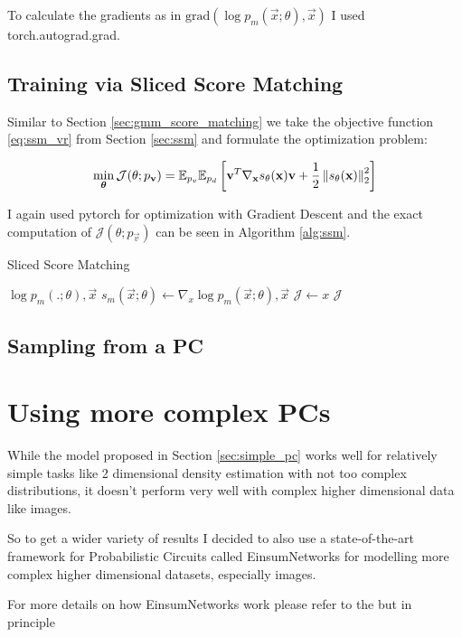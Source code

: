 To calculate the gradients as in $\text{grad}(\log p_m(\vec x;\theta), \vec x)$ I used torch.autograd.grad. 


\subsection{Training via Sliced Score Matching}
\label{sec:gmm_ssm}

Similar to Section \ref{sec:gmm_score_matching} we take the objective function \ref{eq:ssm_vr} from Section \ref{sec:ssm} and formulate
the optimization problem:

\begin{equation}
    \min_{\substack{\boldsymbol \theta}}  \mathcal{J}(\theta; p_{\textbf{v}}) = \mathbb{E}_{p_v} \mathbb{E}_{p_d} \left[ \textbf{v}^T \nabla_{\textbf{x}} s_\theta(\textbf{x}) \textbf{v} + \frac{1}{2} \left\lVert s_\theta(\textbf{x}) \right\rVert^2_2 \right]
    \label{eq:ssm_optimization_problem}
\end{equation}

I again used pytorch for optimization with Gradient Descent and the exact computation of $\mathcal{J}(\theta; p_\vec{v})$ can be seen 
in Algorithm \ref{alg:ssm}.

\begin{algorithm}
    \caption{Sliced Score Matching}
    \label{alg:ssm}
    \begin{algorithmic}[1]  
        \Require $\log p_m(.;\theta), \vec x$
        \State $s_m(\vec x; \theta) \gets \nabla_x \log p_m(\vec x;\theta), \vec x$
        \State $\mathcal{J} \gets x$
        \State \Return $\mathcal{J}$
    \end{algorithmic}
\end{algorithm}

\subsection{Sampling from a PC}
\label{sec:gmm_sampling}

\section{Using more complex PCs}

While the model proposed in Section \ref{sec:simple_pc} works well for relatively simple tasks like 2 dimensional density estimation 
with not too complex distributions, it doesn't perform very well with complex higher dimensional data like images. 

So to get a wider variety of results I decided to also use a state-of-the-art framework for Probabilistic Circuits called 
EinsumNetworks \cite{einsum} for modelling more complex higher dimensional datasets, especially images. 

For more details on how EinsumNetworks work please refer to the \cite{einsum} but in principle 
